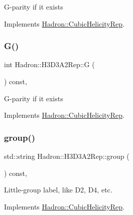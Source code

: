 G-\/parity if it exists 

Implements \mbox{\hyperlink{structHadron_1_1CubicHelicityRep_a50689f42be1e6170aa8cf6ad0597018b}{Hadron\+::\+Cubic\+Helicity\+Rep}}.

\mbox{\label{structHadron_1_1H3D3A2Rep_aae22d0d5ee1cbaa01ff3677e011105bc}} 
\subsubsection{\texorpdfstring{G()}{G()}\hspace{0.1cm}{\footnotesize\ttfamily [2/2]}}
{\footnotesize\ttfamily int Hadron\+::\+H3\+D3\+A2\+Rep\+::G (\begin{DoxyParamCaption}{ }\end{DoxyParamCaption}) const\hspace{0.3cm}{\ttfamily [inline]}, {\ttfamily [virtual]}}

G-\/parity if it exists 

Implements \mbox{\hyperlink{structHadron_1_1CubicHelicityRep_a50689f42be1e6170aa8cf6ad0597018b}{Hadron\+::\+Cubic\+Helicity\+Rep}}.

\mbox{\label{structHadron_1_1H3D3A2Rep_ab7175e896239ed28493bfe574e0b6b9e}} 
\subsubsection{\texorpdfstring{group()}{group()}\hspace{0.1cm}{\footnotesize\ttfamily [1/3]}}
{\footnotesize\ttfamily std\+::string Hadron\+::\+H3\+D3\+A2\+Rep\+::group (\begin{DoxyParamCaption}{ }\end{DoxyParamCaption}) const\hspace{0.3cm}{\ttfamily [inline]}, {\ttfamily [virtual]}}

Little-\/group label, like D2, D4, etc. 

Implements \mbox{\hyperlink{structHadron_1_1CubicHelicityRep_a101a7d76cd8ccdad0f272db44b766113}{Hadron\+::\+Cubic\+Helicity\+Rep}}.

\mbox{\label{structHadron_1_1H3D3A2Rep_ab7175e896239ed28493bfe574e0b6b9e}} 
